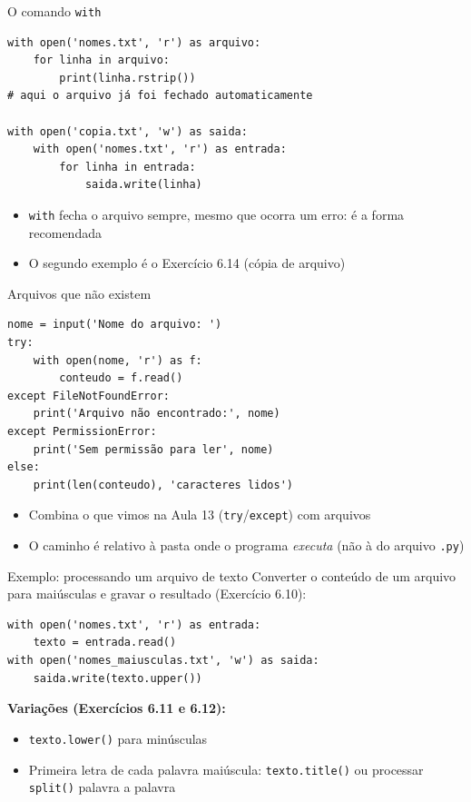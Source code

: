 \documentclass[aspectratio=169,10pt,t]{beamer}
\begin{document}
\begin{frame}[fragile]{O comando \texttt{with}}
\begin{lstlisting}
with open('nomes.txt', 'r') as arquivo:
    for linha in arquivo:
        print(linha.rstrip())
# aqui o arquivo já foi fechado automaticamente

with open('copia.txt', 'w') as saida:
    with open('nomes.txt', 'r') as entrada:
        for linha in entrada:
            saida.write(linha)
\end{lstlisting}
  \begin{itemize}
    \item \texttt{with} fecha o arquivo \alert{sempre}, mesmo que ocorra um erro: é a forma recomendada
    \item O segundo exemplo é o Exercício 6.14 (cópia de arquivo)
  \end{itemize}
\end{frame}

\begin{frame}[fragile]{Arquivos que não existem}
\begin{lstlisting}
nome = input('Nome do arquivo: ')
try:
    with open(nome, 'r') as f:
        conteudo = f.read()
except FileNotFoundError:
    print('Arquivo não encontrado:', nome)
except PermissionError:
    print('Sem permissão para ler', nome)
else:
    print(len(conteudo), 'caracteres lidos')
\end{lstlisting}
  \begin{itemize}
    \item Combina o que vimos na Aula 13 (\texttt{try}/\texttt{except}) com arquivos
    \item O caminho é relativo à pasta onde o programa \emph{executa} (não à do arquivo \texttt{.py})
  \end{itemize}
\end{frame}

\begin{frame}[fragile]{Exemplo: processando um arquivo de texto}
  Converter o conteúdo de um arquivo para maiúsculas e gravar o resultado (Exercício 6.10):
\begin{lstlisting}
with open('nomes.txt', 'r') as entrada:
    texto = entrada.read()
with open('nomes_maiusculas.txt', 'w') as saida:
    saida.write(texto.upper())
\end{lstlisting}
  \textbf{Variações (Exercícios 6.11 e 6.12):}
  \begin{itemize}
    \item \texttt{texto.lower()} para minúsculas
    \item Primeira letra de cada palavra maiúscula: \texttt{texto.title()} ou processar \texttt{split()} palavra a palavra
  \end{itemize}
\end{frame}
\end{document}
